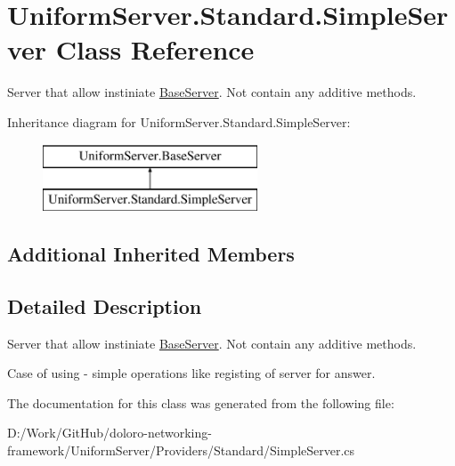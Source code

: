 \hypertarget{class_uniform_server_1_1_standard_1_1_simple_server}{}\section{Uniform\+Server.\+Standard.\+Simple\+Server Class Reference}
\label{class_uniform_server_1_1_standard_1_1_simple_server}


Server that allow instiniate \mbox{\hyperlink{class_uniform_server_1_1_base_server}{Base\+Server}}. Not contain any additive methods.  


Inheritance diagram for Uniform\+Server.\+Standard.\+Simple\+Server\+:\begin{figure}[H]
\begin{center}
\leavevmode
\includegraphics[height=2.000000cm]{db/daa/class_uniform_server_1_1_standard_1_1_simple_server}
\end{center}
\end{figure}
\subsection*{Additional Inherited Members}


\subsection{Detailed Description}
Server that allow instiniate \mbox{\hyperlink{class_uniform_server_1_1_base_server}{Base\+Server}}. Not contain any additive methods. 

Case of using -\/ simple operations like registing of server for answer. 

The documentation for this class was generated from the following file\+:\begin{DoxyCompactItemize}
\item 
D\+:/\+Work/\+Git\+Hub/doloro-\/networking-\/framework/\+Uniform\+Server/\+Providers/\+Standard/Simple\+Server.\+cs\end{DoxyCompactItemize}
